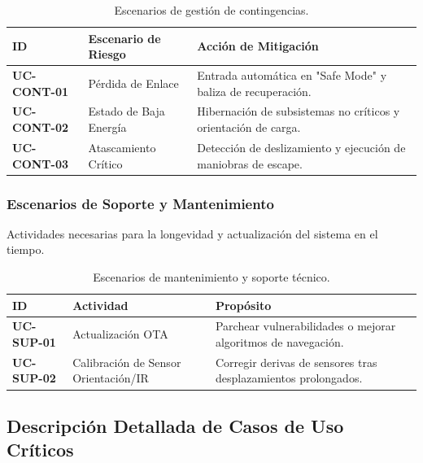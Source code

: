 \begin{table}[H]
	\centering
	\caption{Escenarios de gestión de contingencias.}
	\begin{tabularx}{\textwidth}{|l|l|X|}
		\hline
		\rowcolor{AgencyBlue!10} \textbf{ID} & \textbf{Escenario de Riesgo} & \textbf{Acción de Mitigación}                                  \\ \hline
		\textbf{UC-CONT-01}                  & Pérdida de Enlace            & Entrada automática en "Safe Mode" y baliza de recuperación.    \\ \hline
		\textbf{UC-CONT-02}                  & Estado de Baja Energía       & Hibernación de subsistemas no críticos y orientación de carga. \\ \hline
		\textbf{UC-CONT-03}                  & Atascamiento Crítico         & Detección de deslizamiento y ejecución de maniobras de escape. \\ \hline
	\end{tabularx}
\end{table}

\subsubsection{Escenarios de Soporte y Mantenimiento}
Actividades necesarias para la longevidad y actualización del sistema en el tiempo.

\begin{table}[H]
	\centering
	\caption{Escenarios de mantenimiento y soporte técnico.}
	\begin{tabularx}{\textwidth}{|l|l|X|}
		\hline
		\rowcolor{AgencyBlue!10} \textbf{ID} & \textbf{Actividad}                   & \textbf{Propósito}                                             \\ \hline
		\textbf{UC-SUP-01}                   & Actualización OTA                    & Parchear vulnerabilidades o mejorar algoritmos de navegación.  \\ \hline
		\textbf{UC-SUP-02}                   & Calibración de Sensor Orientación/IR & Corregir derivas de sensores tras desplazamientos prolongados. \\ \hline
	\end{tabularx}
\end{table}

\subsection{Descripción Detallada de Casos de Uso Críticos}


